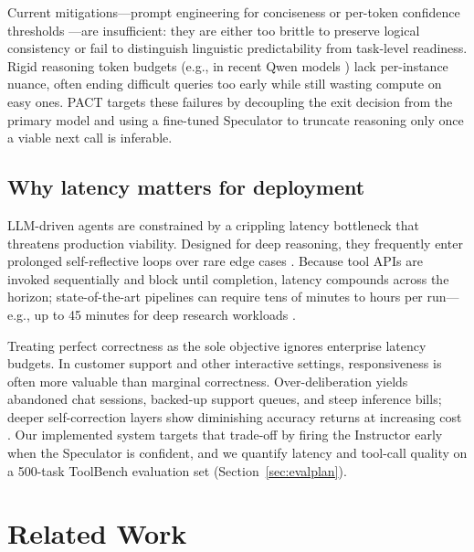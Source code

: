 \documentclass[letterpaper,twocolumn,10pt]{article}
\begin{document}
Current mitigations---prompt engineering for conciseness or per-token confidence thresholds \cite{schuster2022calm}---are insufficient: they are either too brittle to preserve logical consistency or fail to distinguish linguistic predictability from task-level readiness. Rigid reasoning token budgets (e.g., in recent Qwen models \cite{qwen3}) lack per-instance nuance, often ending difficult queries too early while still wasting compute on easy ones. PACT targets these failures by decoupling the exit decision from the primary model and using a fine-tuned Speculator to truncate reasoning only once a viable next call is inferable.

\subsection{Why latency matters for deployment}

LLM-driven agents are constrained by a crippling latency bottleneck that threatens production viability. Designed for deep reasoning, they frequently enter prolonged self-reflective loops over rare edge cases \cite{masterman2025ai}. Because tool APIs are invoked sequentially and block until completion, latency compounds across the horizon; state-of-the-art pipelines can require tens of minutes to hours per run---e.g., up to 45 minutes for deep research workloads \cite{mialon2023gaia}.

Treating perfect correctness as the sole objective ignores enterprise latency budgets. In customer support and other interactive settings, responsiveness is often more valuable than marginal correctness. Over-deliberation yields abandoned chat sessions, backed-up support queues, and steep inference bills; deeper self-correction layers show diminishing accuracy returns at increasing cost \cite{overthinking2025}. Our implemented system targets that trade-off by firing the Instructor early when the Speculator is confident, and we quantify latency and tool-call quality on a 500-task ToolBench evaluation set \cite{qin2023toolbench} (Section~\ref{sec:evalplan}).

\section{Related Work}
\label{sec:related}
\end{document}
